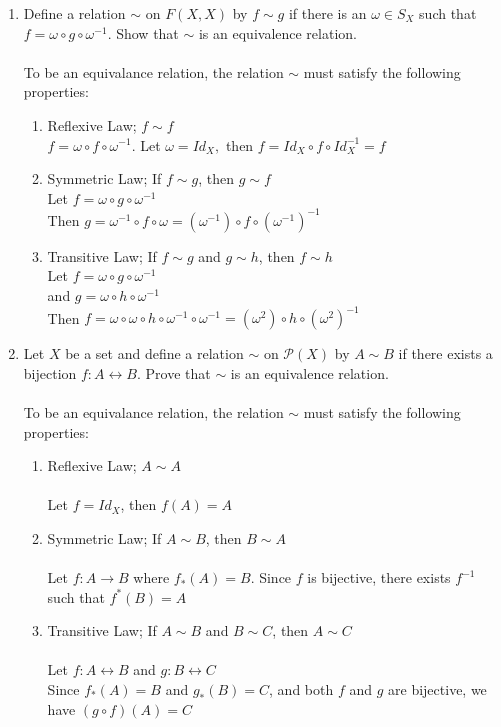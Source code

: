 \documentclass[11pt]{article}
\begin{document}
\begin{enumerate}
\newpage
\item Define a relation $\sim$ on $F(X, X)$ by $f \sim g$ if there is an $\omega \in S_X$ such that $f = \omega \circ g \circ \omega^{-1}$.  Show that $\sim$ is an equivalence relation.\\
\\
To be an equivalance relation, the relation $\sim$ must satisfy the following properties:
\begin{enumerate}
\item Reflexive Law; $f \sim f$\\
$f = \omega \circ f \circ \omega^{-1}$.  Let $\omega = Id_X,$ then $f = Id_X \circ f \circ Id_X^{-1} = f$ 
\item Symmetric Law; If $f \sim g$, then $g \sim f$\\
Let $f = \omega \circ g \circ \omega^{-1}$\\
Then $g = \omega^{-1} \circ f \circ \omega = (\omega^{-1}) \circ f \circ (\omega^{-1})^{-1}$
\item Transitive Law; If $f \sim g$ and $g \sim h$, then $f \sim h$\\
Let $f = \omega \circ g \circ \omega^{-1}$\\
and $g = \omega \circ h \circ \omega^{-1}$\\
Then $f = \omega \circ \omega \circ h \circ \omega^{-1} \circ \omega^{-1} = (\omega^2) \circ h \circ (\omega^2)^{-1}$
\end{enumerate}

\newpage
\item Let $X$ be a set and define a relation $\sim$ on $\mathcal{P}(X)$ by $A \sim B$ if there exists a bijection $f:A \leftrightarrow B$.  Prove that $\sim$ is an equivalence relation.
\\\\
To be an equivalance relation, the relation $\sim$ must satisfy the following properties:
\begin{enumerate}
\item Reflexive Law; $A \sim A$\\
\\
Let $f = Id_X$, then $f(A) = A$\\
\item Symmetric Law; If $A \sim B$, then $B \sim A$\\
\\Let $f:A \to B$ where $f_*(A) = B$.  Since $f$ is bijective, there exists $f^{-1}$ such that 	$f^*(B) = A$
\\
\item Transitive Law; If $A \sim B$ and $B \sim C$, then $A \sim C$\\
\\
Let $f:A \leftrightarrow B$ and $g:B \leftrightarrow C$
\\
Since $f_*(A) = B$ and $g_*(B) = C$, and both $f$ and $g$ are bijective, we have $(g \circ f)(A) = C$
\end{enumerate}
\end{enumerate} %
\end{document}
